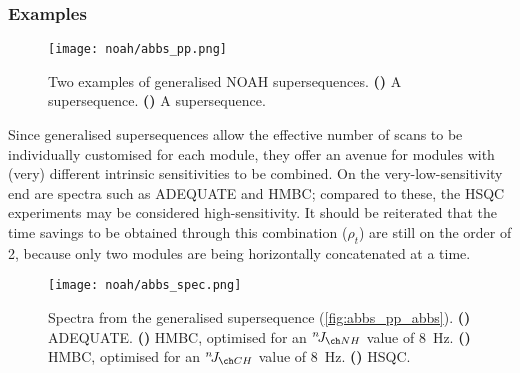 \subsubsection{Examples}

\begin{figure}[!ht]
    \centering
    \texttt{[image: noah/abbs\_pp.png]}%
    {\label{fig:abbs_pp_abbs}}%
    {\label{fig:abbs_pp_abbss}}%
    \caption[Examples of generalised supersequences]{
        Two examples of generalised NOAH supersequences.
        \textbf{()} A  supersequence.
        \textbf{()} A  supersequence.
    }
    \label{fig:abbs_pp}
\end{figure}

Since generalised supersequences allow the effective number of scans to be individually customised for each module, they offer an avenue for modules with (very) different intrinsic sensitivities to be combined.
On the very-low-sensitivity end are spectra such as ADEQUATE and \nitrogen{} HMBC; compared to these, the HSQC experiments may be considered high-sensitivity.
It should be reiterated that the time savings to be obtained through this combination ($\rho_t$) are still on the order of 2, because only two modules are being horizontally concatenated at a time.


\begin{figure}[!htb]
    \centering
    \texttt{[image: noah/abbs\_spec.png]}%
    {\label{fig:abbs_spec_a}}%
    {\label{fig:abbs_spec_bn}}%
    {\label{fig:abbs_spec_b}}%
    {\label{fig:abbs_spec_s}}%
    \caption[Spectra from  generalised supersequence]{
        Spectra from the  generalised supersequence (\cref{fig:abbs_pp_abbs}).
        \textbf{()} ADEQUATE.
        \textbf{()} \nitrogen{} HMBC, optimised for an $\nJ{NH}$ value of \qty{8}{\Hz}.
        \textbf{()} \carbon{} HMBC, optimised for an $\nJ{CH}$ value of \qty{8}{\Hz}.
        \textbf{()} \carbon{} HSQC.
    }
    \label{fig:abbs_spec}
\end{figure}

